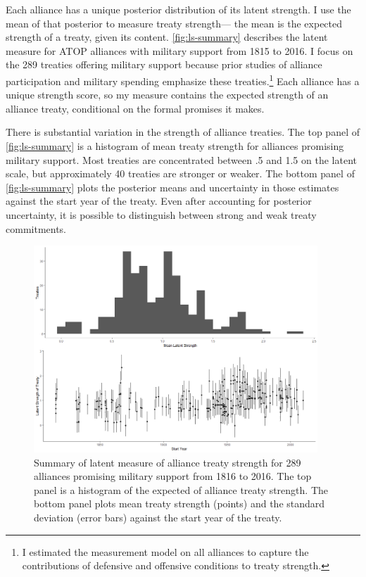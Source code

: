 \documentclass[12pt]{article}
\begin{document}
Each alliance has a unique posterior distribution of its latent strength. 
I use the mean of that posterior to measure treaty strength--- the mean is the expected strength of a treaty, given its content. 
\autoref{fig:ls-summary} describes the latent measure for ATOP alliances  with military support from 1815 to 2016.
I focus on the 289 treaties offering military support because prior studies of alliance participation and military spending emphasize these treaties.\footnote{
I estimated the measurement model on all alliances to capture the contributions of defensive and offensive conditions to treaty strength.}
Each alliance has a unique strength score, so my measure contains the expected strength of an alliance treaty, conditional on the formal promises it makes. 


There is substantial variation in the strength of alliance treaties. 
The top panel of \autoref{fig:ls-summary} is a histogram of mean treaty strength for alliances promising military support. 
Most treaties are concentrated between .5 and 1.5 on the latent scale, but approximately 40 treaties are stronger or weaker. 
The bottom panel of \autoref{fig:ls-summary} plots the posterior means and uncertainty in those estimates against the start year of the treaty. 
Even after accounting for posterior uncertainty, it is possible to distinguish between strong and weak treaty commitments. 


\begin{figure}
	\centering
		\includegraphics[width=0.95\textwidth]{../figures/ls-summary.png}
	\caption{Summary of latent measure of alliance treaty strength for 289 alliances promising military support from 1816 to 2016. The top panel is a histogram of the expected of alliance treaty strength. The bottom panel plots mean treaty strength (points) and the standard deviation (error bars) against the start year of the treaty.}
	\label{fig:ls-summary}
\end{figure}
\end{document}
